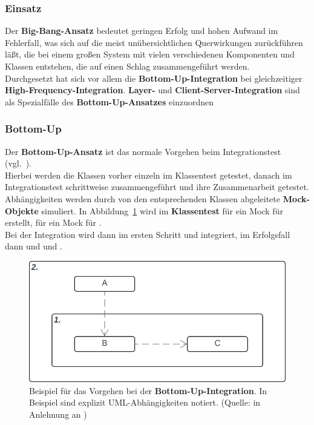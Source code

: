 \subsubsection*{Einsatz}
Der \textbf{Big-Bang-Ansatz} bedeutet geringen Erfolg und hohen Aufwand im Fehlerfall, was sich auf die meist unübersichtlichen Querwirkungen zurückführen läßt, die bei einem großen System mit vielen verschiedenen Komponenten und Klassen entstehen, die auf einen Schlag zusammengeführt werden.\\
Durchgesetzt hat sich vor allem die \textbf{Bottom-Up-Integration} bei gleichzeitiger \textbf{High-Frequency-Integration}. \textbf{Layer-} und \textbf{Client-Server-Integration} sind als Spezialfälle des \textbf{Bottom-Up-Ansatzes} einzuordnen

\subsubsection*{Bottom-Up}
Der \textbf{Bottom-Up-Ansatz} ist das normale Vorgehen beim Integrationstest (vgl.~\cite[60]{Wed09c}).\\
Hierbei werden die Klassen vorher einzeln im Klassentest getestet, danach im Integrationstest schrittweise zusammengeführt und ihre Zusammenarbeit getestet.
Abhängigkeiten werden durch von den entsprechenden Klassen abgeleitete \textbf{Mock-Objekte} simuliert.
In Abbildung~\ref{fig:bottomup} wird im \textbf{Klassentest} für  ein Mock für  erstellt, für  ein Mock für .\\
Bei der Integration wird dann im ersten Schritt  und  integriert, im Erfolgsfall dann  und  und .

\begin{figure}
    \centering
    \includegraphics[scale=0.4]{part four/Testende Verfahren/img/bottomup}
    \caption{Beispiel für das Vorgehen bei der \textbf{Bottom-Up-Integration}. In Beispiel sind explizit UML-Abhängigkeiten notiert. (Quelle: in Anlehnung an \cite[Abb. 5.5, 60]{Wed09c})}
    \label{fig:bottomup}
\end{figure}

